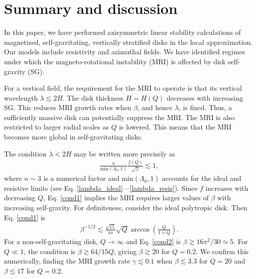\section{Summary and discussion}\label{summary}
In this paper, we have performed axisymmetric linear stability
calculations of magnetized, self-gravitating, vertically stratified
disks in the local approximation. Our models include resistivity and
azimuthal fields. We have identified regimes under which the
magneto-rotational instability (MRI) is affected by disk self-gravity
(SG).   


For a vertical field, the requirement for the MRI to operate is that   
its vertical wavelength $\lambda \lesssim 2H$.  
The disk thickness $H=H(Q)$ decreases with increasing SG. This 
reduces MRI growth rates when 
$\beta$, and hence $\lambda$, is fixed.  
Thus, a sufficiently massive disk can potentially suppress the MRI. 
The MRI is also restricted to larger radial 
scales as $Q$ is lowered. This means that the MRI becomes more global
in self-gravitating disks. 

  The condition $\lambda < 2H$ 
  may be written more precisely as 
  \begin{align}\label{cond1}
    \frac{n}{\mathrm{min}(\Lambda_0, 1)}\frac{f(Q)}{\sqrt{\beta}} \lesssim 1,
  \end{align}
  where $n\sim 3$ is a numerical factor and
  $\mathrm{min}(\Lambda_0,1)$ accounts for the ideal and resistive
  limits (see Eq. \ref{lambda_ideal}---\ref{lambda_resis}). Since $f$
  increases with decreasing $Q$, Eq. \ref{cond1} implies
  the MRI requires larger values of $\beta$ with  
  increasing self-gravity. 
  For definiteness, consider the ideal polytropic disk. Then Eq. \ref{cond1} is
  \begin{align}\label{cond2}
    \beta^{-1/2} \lesssim
    \frac{\sqrt{15}}{4\pi}\sqrt{Q}\arccos{\left(\frac{Q}{1+Q}\right)}. 
  \end{align}
  For a non-self-gravitating disk, $Q\to\infty$ and Eq. \ref{cond2} is
  $\beta \gtrsim 16\pi^2/30\simeq 5$. For $Q\ll 1$, the condition is
  $\beta \gtrsim 64/15Q$, giving $\beta\gtrsim 20$ for
  $Q=0.2$. We confirm this numerically, finding the MRI growth rate
  $\gamma  \lesssim 0.1$ when $\beta \lesssim 3.3$ for $Q=20$ and 
  $\beta \lesssim 17$ for $Q=0.2$.  

